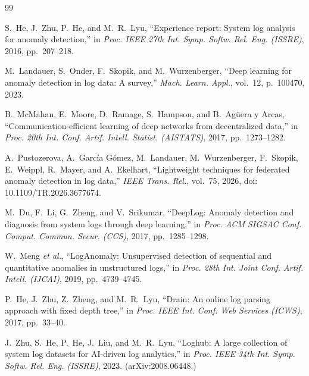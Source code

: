 \documentclass[journal]{IEEEtran}
\begin{document}
% 
% 
\begin{thebibliography}{99}

S.~He, J.~Zhu, P.~He, and M.~R.~Lyu, ``Experience report: System log analysis for anomaly
detection,'' in \emph{Proc. IEEE 27th Int. Symp. Softw. Rel. Eng. (ISSRE)}, 2016, pp.~207--218.

M.~Landauer, S.~Onder, F.~Skopik, and M.~Wurzenberger, ``Deep learning for anomaly detection
in log data: A survey,'' \emph{Mach. Learn. Appl.}, vol.~12, p.~100470, 2023.

B.~McMahan, E.~Moore, D.~Ramage, S.~Hampson, and B.~Ag\"{u}era y Arcas,
``Communication-efficient learning of deep networks from decentralized data,'' in
\emph{Proc. 20th Int. Conf. Artif. Intell. Statist. (AISTATS)}, 2017, pp.~1273--1282.

A.~Pustozerova, A.~Garc\'{i}a G\'{o}mez, M.~Landauer, M.~Wurzenberger, F.~Skopik, E.~Weippl,
R.~Mayer, and A.~Ekelhart, ``Lightweight techniques for federated anomaly detection in log
data,'' \emph{IEEE Trans. Rel.}, vol.~75, 2026, doi: 10.1109/TR.2026.3677674.

M.~Du, F.~Li, G.~Zheng, and V.~Srikumar, ``DeepLog: Anomaly detection and diagnosis from system
logs through deep learning,'' in \emph{Proc. ACM SIGSAC Conf. Comput. Commun. Secur. (CCS)},
2017, pp.~1285--1298.

W.~Meng \emph{et al.}, ``LogAnomaly: Unsupervised detection of sequential and quantitative
anomalies in unstructured logs,'' in \emph{Proc. 28th Int. Joint Conf. Artif. Intell. (IJCAI)},
2019, pp.~4739--4745.

P.~He, J.~Zhu, Z.~Zheng, and M.~R.~Lyu, ``Drain: An online log parsing approach with fixed depth
tree,'' in \emph{Proc. IEEE Int. Conf. Web Services (ICWS)}, 2017, pp.~33--40.

J.~Zhu, S.~He, P.~He, J.~Liu, and M.~R.~Lyu, ``Loghub: A large collection of system log datasets
for AI-driven log analytics,'' in \emph{Proc. IEEE 34th Int. Symp. Softw. Rel. Eng. (ISSRE)},
2023. (arXiv:2008.06448.)


\end{thebibliography}
\end{document}
